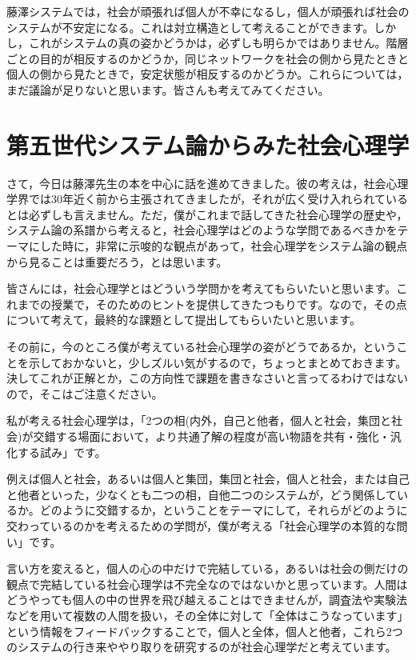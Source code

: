 \documentclass{ltjsbook}
\begin{document}
藤澤システムでは，社会が頑張れば個人が不幸になるし，個人が頑張れば社会のシステムが不安定になる。これは対立構造として考えることができます。しかし，これがシステムの真の姿かどうかは，必ずしも明らかではありません。階層ごとの目的が相反するのかどうか，同じネットワークを社会の側から見たときと個人の側から見たときで，安定状態が相反するのかどうか。これらについては，まだ議論が足りないと思います。皆さんも考えてみてください。

\section{第五世代システム論からみた社会心理学}

さて，今日は藤澤先生の本\parencite{fujisawaNetwork}を中心に話を進めてきました。彼の考えは，社会心理学界では30年近く前から主張されてきましたが，それが広く受け入れられているとは必ずしも言えません。ただ，僕がこれまで話してきた社会心理学の歴史や，システム論の系譜から考えると，社会心理学はどのような学問であるべきかをテーマにした時に，非常に示唆的な観点があって，社会心理学をシステム論の観点から見ることは重要だろう，とは思います。

皆さんには，社会心理学とはどういう学問かを考えてもらいたいと思います。これまでの授業で，そのためのヒントを提供してきたつもりです。なので，その点について考えて，最終的な課題として提出してもらいたいと思います。

その前に，今のところ僕が考えている社会心理学の姿がどうであるか，ということを示しておかないと，少しズルい気がするので，ちょっとまとめておきます。決してこれが正解とか，この方向性で課題を書きなさいと言ってるわけではないので，そこはご注意ください。

私が考える社会心理学は，「2つの相(内外，自己と他者，個人と社会，集団と社会)が交錯する場面において，より共通了解の程度が高い物語を共有・強化・汎化する試み」です。

例えば個人と社会，あるいは個人と集団，集団と社会，個人と社会，または自己と他者といった，少なくとも二つの相，自他二つのシステムが，どう関係しているか。どのように交錯するか，ということをテーマにして，それらがどのように交わっているのかを考えるための学問が，僕が考える「社会心理学の本質的な問い」です。

言い方を変えると，個人の心の中だけで完結している，あるいは社会の側だけの観点で完結している社会心理学は不完全なのではないかと思っています。人間はどうやっても個人の中の世界を飛び越えることはできませんが，調査法や実験法などを用いて複数の人間を扱い，その全体に対して「全体はこうなっています」という情報をフィードバックすることで，個人と全体，個人と他者，これら2つのシステムの行き来ややり取りを研究するのが社会心理学だと考えています。
\end{document}
